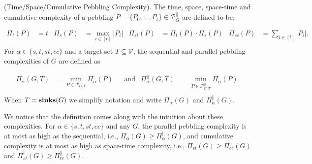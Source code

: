 \begin{definition}{(Time/Space/Cumulative Pebbling Complexity).}\textnormal{\cite{cryptoeprint:2016:875}}
  The time, space, space-time and cumulative complexity of a pebbling $P=\{ P_0,\dots,P_t \} \in \mathcal{P}_{G}^{||}$ are defined to be:

  \begin{align*}
    \Pi_t(P)&= t  &  \Pi_s(P)&= \underset{i \in [t]}{\max} \lvert P_i \rvert &  \Pi_{st}(P)&= \Pi_t(P) \cdot \Pi_s(P) & \Pi_{cc}(P)&= \underset{i \in [t]}{\sum} \lvert P_i \rvert .\\
  \end{align*}
  For $\alpha \in \{ s,t,st,cc \}$ and a target set $T \subseteq \mathcal{V}$, the sequential and parallel pebbling complexities of $G$ are defined as

  \begin{align*}
    \Pi_\alpha(G,T)&= \underset{P \in \mathcal{P}_{G,T}}{\min} \Pi_{\alpha}(P) &  &\mbox{and} & \Pi_{\alpha}^{||}(G,T)&= \underset{P \in \mathcal{P}_{G,T}^{||}}{\min} \Pi_{\alpha}(P) .\\
  \end{align*}
  When $T=\mbox{\textbf{sinks}}(G)$ we simplify notation and write $\Pi_{\alpha}(G)$ and $\Pi_{\alpha}^{||}(G)$.
%
\end{definition}
We notice that the definition comes along with the intuition about these complexities. For $\alpha \in \{ s,t,st,cc \}$ and any $G$, the parallel pebbling complexity is at most as high as the sequential,
i.e., $\Pi_\alpha(G) \geq \Pi_{\alpha}^{||}(G)$, and cumulative complexity is at most as high as space-time complexity, i.e., $\Pi_{st}(G) \geq \Pi_{cc}(G)$ and $\Pi_{st}^{||}(G) \geq \Pi_{cc}^{||}(G)$.\\
%
